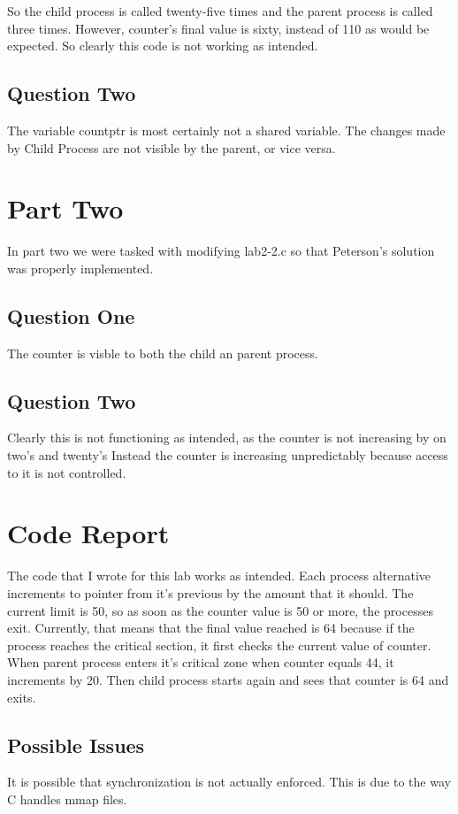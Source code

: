 \documentclass[12pt, titlepage]{article}
\begin{document}
\par{}
So the child process is called twenty-five times and the parent process is called three times.
However, counter's final value is sixty, instead of 110 as would be expected.
So clearly this code is not working as intended.
\subsection*{Question Two}
\par{}
The variable countptr is most certainly not a shared variable.
The changes made by Child Process are not visible by the parent, or vice versa.
\section*{Part Two}
\par{}
In part two we were tasked with modifying lab2-2.c so that Peterson's solution
was properly implemented.
\subsection*{Question One}
\par{}
\par{}
The counter is visble to both the child an parent process.
\subsection*{Question Two}
\par{}
Clearly this is not functioning as intended, as the counter
is not increasing by on two's and twenty's
Instead the counter is increasing unpredictably because 
access to it is not controlled.
\section*{Code Report}
\par{}
The code that I wrote for this lab works as intended.
Each process alternative increments to pointer from it's previous by the amount that it should. 
The current limit is 50, so as soon as the counter value is 50 or more, the processes exit.
Currently, that means that the final value reached is 
64 because if the process reaches the critical section,
it first checks the current value of counter.
When parent process enters it's critical zone when 
counter equals 44, it increments by 20.
Then child process starts again and sees that counter 
is 64 and exits.

\subsection*{Possible Issues}
\par{} 
It is possible that synchronization is not actually enforced.
This is due to the way C handles mmap files.
\end{document}
